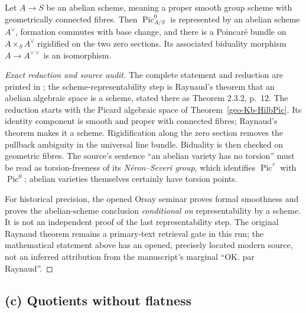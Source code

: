 \begin{theorem}
\label{geo-Kb-dual}
Let $A\to S$ be an abelian scheme, meaning a proper smooth group scheme
with geometrically connected fibres. Then $\operatorname{Pic}^0_{A/S}$ is
represented by an abelian scheme $A^\vee$, formation commutes with base
change, and there is a Poincar\'e bundle on $A\times_S A^\vee$ rigidified
on the two zero sections. Its associated biduality morphism
$A\to A^{\vee\vee}$ is an isomorphism.
\end{theorem}
\begin{proof}[Exact reduction and source audit]
The complete statement and reduction are printed in
\cite[Theorem 2.3.7, p.~15]{RobertAV2023}; the scheme-representability step
is Raynaud's theorem that an abelian algebraic space is a scheme, stated
there as Theorem 2.3.2, p.~12. The reduction starts with the Picard algebraic
space of Theorem~\ref{geo-Kb-HilbPic}. Its identity component is smooth and
proper with connected fibres; Raynaud's theorem makes it a scheme.
Rigidification along the zero section removes the pullback ambiguity in
the universal line bundle. Biduality is then checked on geometric fibres.
The source's sentence ``an abelian variety has no torsion'' must be read
as torsion-freeness of its \emph{N\'eron--Severi group}, which identifies
$\operatorname{Pic}^{\tau}$ with $\operatorname{Pic}^0$; abelian varieties
themselves certainly have torsion points.

For historical precision, the opened Orsay seminar
\cite[IX, Theorem 2.1; XI, 3.5]{RaynaudOrsay1967} proves formal smoothness
and proves the abelian-scheme conclusion \emph{conditional on}
representability by a scheme. It is not an independent proof of the last
representability step. The original Raynaud theorem remains a primary-text
retrieval gate in this run; the mathematical statement above has an opened,
precisely located modern source, not an inferred attribution from the
manuscript's marginal ``OK. par Raynaud''.
\end{proof}

\subsection{(c) Quotients without flatness}

